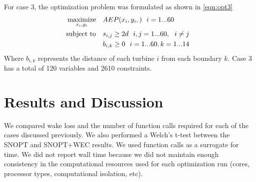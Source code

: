 \documentclass[a4paper]{jpconf}
\begin{document}
%
For case 3, the optimization problem was formulated as shown in \cref{eqn:opt3}
%
\begin{equation}
\label{eqn:opt3}
\begin{aligned} [b]
\underset{x_i,y_i}{\textrm{maximize}} \quad & AEP(x_i,y_i,)~~i=1...60\\
\textrm{subject to} \quad & s_{i,j} \geq 2\*d~~i,j=1...60,~~i \neq j\\
& b_{i,k} \geq 0 ~~ i=1...60, k=1...14
\end{aligned}
\end{equation}
%
Where $b_{i,k}$ represents the distance of each turbine $i$ from each boundary $k$. Case 3 has a total of 120 variables and 2610 constraints.

\section{Results and Discussion}\label{sec:resultsanddiscussion}
We compared wake loss and the number of function calls required for each of the cases discussed previously. We also performed a Welch's t-test between the SNOPT and SNOPT+WEC results. We used function calls as a surrogate for time. We did not report wall time because we did not maintain enough consistency in the computational resources used for each optimization run (cores, processor types, computational isolation, etc). 
\end{document}

